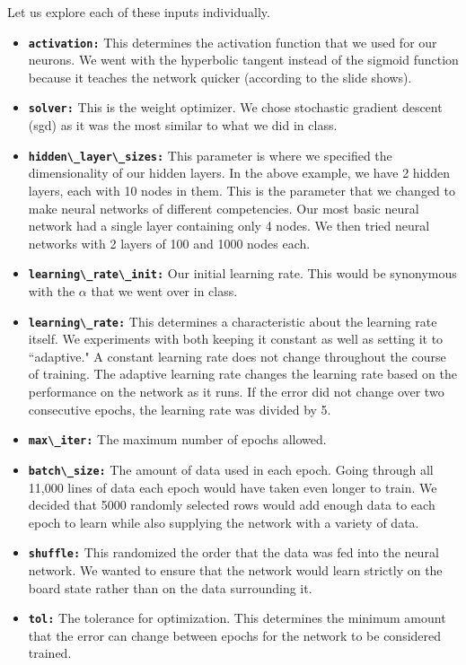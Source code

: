 \documentclass[12pt]{article}
\begin{document}
Let us explore each of these inputs individually.
\begin{itemize}
\item \textbf{\lstinline|activation:|} This determines the activation function that we used for our neurons. We went with the hyperbolic tangent instead of the sigmoid function because it teaches the network quicker (according to the slide shows).

\item \textbf{\lstinline|solver:|} This is the weight optimizer. We chose stochastic gradient descent (sgd) as it was the most similar to what we did in class.

\item \textbf{\lstinline|hidden\_layer\_sizes:|} This parameter is where we specified the dimensionality of our hidden layers. In the above example, we have 2 hidden layers, each with 10 nodes in them. This is the parameter that we changed to make neural networks of different competencies. Our most basic neural network had a single layer containing only 4 nodes. We then tried neural networks with 2 layers of 100 and 1000 nodes each.

\item \textbf{\lstinline|learning\_rate\_init:|} Our initial learning rate. This would be synonymous with the $\alpha$ that we went over in class.

\item \textbf{\lstinline|learning\_rate:|} This determines a characteristic about the learning rate itself. We experiments with both keeping it constant as well as setting it to ``adaptive." A constant learning rate does not change throughout the course of training. The adaptive learning rate changes the learning rate based on the performance on the network as it runs. If the error did not change over two consecutive epochs, the learning rate was divided by 5.

\item \textbf{\lstinline|max\_iter:|} The maximum number of epochs allowed.

\item \textbf{\lstinline|batch\_size:|} The amount of data used in each epoch. Going through all 11,000 lines of data each epoch would have taken even longer to train. We decided that 5000 randomly selected rows would add enough data to each epoch to learn while also supplying the network with a variety of data.

\item\textbf{\lstinline|shuffle:|} This randomized the order that the data was fed into the neural network. We wanted to ensure that the network would learn strictly on the board state rather than on the data surrounding it.

\item\textbf{\lstinline|tol:|} The tolerance for optimization. This determines the minimum amount that the error can change between epochs for the network to be considered trained.
\end{itemize}
\end{document}
